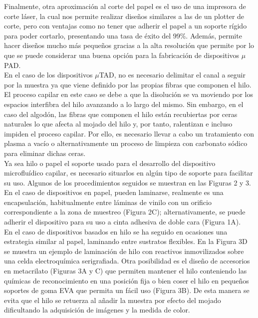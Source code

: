 \documentclass{article}
\begin{document}
Finalmente, otra aproximación al corte del papel es el uso de una impresora de corte láser, la cual nos permite realizar diseños similares a las de un plotter de corte, pero con ventajas como no tener que adherir el papel a un soporte rígido para poder cortarlo, presentando una tasa de éxito del 99\%. Además, permite hacer diseños mucho más pequeños gracias a la alta resolución que permite por lo que se puede considerar una buena opción para la fabricación de dispositivos $\mu$PAD. \\

En el caso de los dispositivos $\mu$TAD, no es necesario delimitar el canal a seguir por la muestra ya que viene definido por las propias fibras que componen el hilo. El proceso capilar en este caso se debe a que la disolución se va moviendo por los espacios interfibra del hilo avanzando a lo largo del mismo. Sin embargo, en el caso del algodón, las fibras que componen el hilo están recubiertas por ceras naturales lo que afecta al mojado del hilo y, por tanto, ralentizan e incluso impiden el proceso capilar. Por ello, es necesario llevar a cabo un tratamiento con plasma a vacío o alternativamente un proceso de limpieza con carbonato sódico para eliminar dichas ceras\cite{Nilghaz2013}.\\


Ya sea hilo o papel el soporte usado para el desarrollo del dispositivo microfluídico capilar, es necesario situarlos en algún tipo de soporte para facilitar su uso. Algunos de los procedimientos seguidos se muestran en las Figuras 2 y 3. En el caso de dispositivos en papel, pueden laminarse, realmente es una encapsulación, habitualmente entre láminas de vinilo con un orificio correspondiente a la zona de muestreo (Figura 2C); alternativamente, se puede adherir el dispositivo para su uso a cinta adhesiva de doble cara (Figura 1A). \\

En el caso de dispositivos basados en hilo se ha seguido en ocasiones una estrategia similar al papel, laminando entre sustratos flexibles. En la Figura 3D se muestra un ejemplo de laminación de hilo con reactivos inmovilizados sobre una celda electroquímica serigrafiada. Otra posibilidad es el diseño de accesorios en metacrilato (Figuras 3A y C) que permiten mantener el hilo conteniendo las químicas de reconocimiento en una posición fija o bien coser el hilo en pequeños soportes de goma EVA que permita un fácil uso (Figura 3B). De esta manera se evita que el hilo se retuerza al añadir la muestra por efecto del mojado dificultando la adquisición de imágenes y la medida de color.\\
\end{document}
